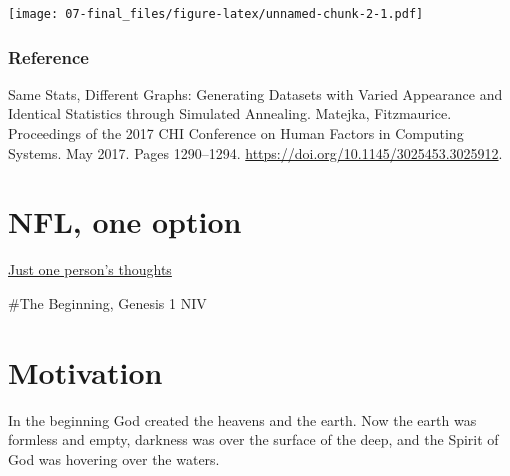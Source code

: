 \documentclass[
]{book}
\begin{document}
\texttt{[image: 07-final\_files/figure-latex/unnamed-chunk-2-1.pdf]}

\hypertarget{reference}{%
\subsection{Reference}\label{reference}}

Same Stats, Different Graphs: Generating Datasets with Varied Appearance and Identical Statistics through Simulated Annealing. Matejka, Fitzmaurice. Proceedings of the 2017 CHI Conference on Human Factors in Computing Systems. May 2017. Pages 1290--1294. \url{https://doi.org/10.1145/3025453.3025912}.

\hypertarget{nfl-one-option}{%
\chapter{NFL, one option}\label{nfl-one-option}}

\href{https://rpubs.com/afuecker/727520}{Just one person's thoughts}

\#The Beginning, Genesis 1 NIV

\hypertarget{motivation-1}{%
\chapter{Motivation}\label{motivation-1}}

In the beginning God created the heavens and the earth. Now the earth was formless and empty, darkness was over the surface of the deep, and the Spirit of God was hovering over the waters.
\end{document}
